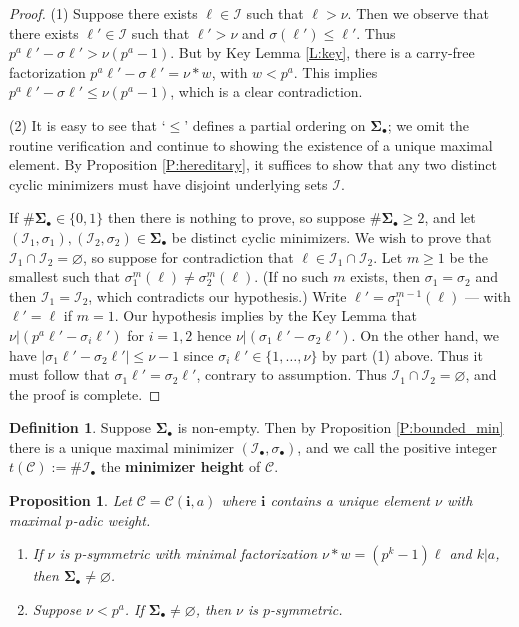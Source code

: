 \documentclass{amsart}
\numberwithin{equation}{section}
\newcommand{\bSig}{\mathbf\Sigma}
\newcommand{\Sb}{\bSig_\bullet}
\newcommand{\Ib}{\cI_\bullet}
\newcommand{\sbb}{\sigma_\bullet}
\newcommand{\cC}{\mathcal{C}}
\newcommand{\cI}{\mathcal{I}}
\newcommand{\bi}{\mathbf{i}}
\theoremstyle{plain}
\newtheorem{proposition}[theorem]{Proposition}
\theoremstyle{definition}
\newtheorem{definition}[theorem]{Definition}
\begin{document}
\begin{proof}
(1) Suppose there exists $\ell\in \cI$ such that $\ell>\nu$.
Then we observe that there exists $\ell'\in \cI$ such that 
$\ell'>\nu$ and $\sigma(\ell')\le \ell'$. 
Thus $p^a\ell'-\sigma\ell' >\nu(p^a-1)$.
But by Key Lemma \ref{L:key},
there is a carry-free factorization
$p^a\ell' - \sigma\ell' = \nu * w$, with $w < p^a$.
This implies $p^a\ell' - \sigma\ell' \le \nu(p^a-1)$,
which is a clear contradiction.

(2) It is easy to see that `$\le$' defines a partial ordering on $\Sb$;
we omit the routine verification and continue to showing the existence
of a unique maximal element.
By Proposition \ref{P:hereditary}, it suffices to show that
any two distinct cyclic minimizers must have disjoint underlying sets $\cI$.

If $\#\Sb \in \{0, 1\}$ then there is nothing to prove,
so suppose $\#\Sb \ge 2$, and let $(\cI_1, \sigma_1), (\cI_2,\sigma_2) \in \Sb$
be distinct cyclic minimizers.
We wish to prove that $\cI_1 \cap \cI_2 = \varnothing$, so
suppose for contradiction that $\ell\in\cI_1 \cap \cI_2$.
Let $m\ge 1$ be the smallest 
    such that $\sigma_1^m(\ell)\ne \sigma_2^m(\ell)$. 
(If no such $m$ exists, then $\sigma_1=\sigma_2$ and then $\cI_1=\cI_2$, which contradicts our hypothesis.)   
    Write $\ell'=\sigma_1^{m-1}(\ell)$ --- with $\ell' = \ell$ if $m=1$.
    Our hypothesis implies by the Key Lemma 
    that $\nu|(p^a\ell'-\sigma_i\ell')$ for $i=1,2$ hence $\nu|(\sigma_1\ell'-\sigma_2\ell')$.
   On the other hand, we have
   $|\sigma_1\ell'-\sigma_2\ell'|\le \nu-1$ since 
   $\sigma_i\ell'\in\{1,\ldots,\nu\}$ by part (1) above.
   Thus it must follow that $\sigma_1\ell' = \sigma_2\ell'$,
   contrary to assumption.
Thus $\cI_1\cap\cI_2=\varnothing$,
and the proof is complete.
\end{proof}


\begin{definition}
\label{D:height}
Suppose $\Sb$ is non-empty.
Then by Proposition \ref{P:bounded_min} there is a unique maximal
minimizer $(\Ib,\sbb)$, 
and we call the positive integer 
$t(\cC):=\#\Ib$ the {\bf minimizer height} of $\cC$.
\end{definition}

\begin{proposition}
\label{P:uniq-perm}
Let $\cC=\cC(\bi,a)$ where $\bi$ contains a unique element $\nu$ with maximal $p$-adic weight. 
\begin{enumerate}
\item If $\nu$ is $p$-symmetric with minimal factorization $\nu * w=(p^k-1)\ell$
and $k|a$, then $\Sb\neq \varnothing$. 
\item Suppose $\nu<p^a$. If $\Sb\neq \varnothing$, 
then $\nu$ is $p$-symmetric. 
\end{enumerate}
\end{proposition}
\end{document}
